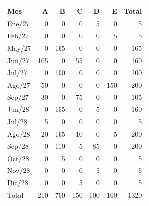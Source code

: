 \begin{tabular}{lr r r r r r}
\toprule
Mes & A & B & C & D & E & Total \\
\midrule
Ene/27 & 0 & 0 & 0 & 5 & 0 & 5 \\
Feb/27 & 0 & 0 & 0 & 0 & 5 & 5 \\
May/27 & 0 & 165 & 0 & 0 & 0 & 165 \\
Jun/27 & 105 & 0 & 55 & 0 & 0 & 160 \\
Jul/27 & 0 & 100 & 0 & 0 & 0 & 100 \\
Ago/27 & 50 & 0 & 0 & 0 & 150 & 200 \\
Sep/27 & 30 & 0 & 75 & 0 & 0 & 105 \\
Jun/28 & 0 & 155 & 0 & 5 & 0 & 160 \\
Jul/28 & 5 & 0 & 0 & 0 & 0 & 5 \\
Ago/28 & 20 & 165 & 10 & 0 & 5 & 200 \\
Sep/28 & 0 & 110 & 5 & 85 & 0 & 200 \\
Oct/28 & 0 & 5 & 0 & 0 & 0 & 5 \\
Nov/28 & 0 & 0 & 0 & 5 & 0 & 5 \\
Dic/28 & 0 & 0 & 5 & 0 & 0 & 5 \\
\midrule
Total & 210 & 700 & 150 & 100 & 160 & 1320 \\
\bottomrule
\end{tabular}
